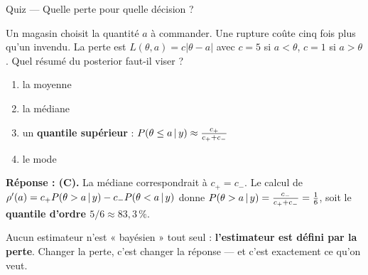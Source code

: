 \begin{frame}{Quiz --- Quelle perte pour quelle décision ?}
\begin{qbox}
Un magasin choisit la quantité $a$ à commander. Une rupture coûte cinq fois plus
qu'un invendu. La perte est
$L(\theta,a)=c|\theta-a|$ avec $c = 5$ si $a<\theta$, $c=1$ si $a>\theta$.
Quel résumé du posterior faut-il viser ?
\vspace{1.5mm}
\begin{enumerate}
  \item[(A)] la moyenne
  \item[(B)] la médiane
  \item[(C)] un \textbf{quantile supérieur} : $P(\theta \leq a \,\vert\, y) \approx \frac{c_+}{c_+ + c_-}$
  \item[(D)] le mode
\end{enumerate}
\vspace{1mm}
\textbf{Réponse : (C).} La médiane correspondrait à $c_+ = c_-$. Le calcul de
$\rho'(a) = c_+ P(\theta > a \,\vert\, y) - c_- P(\theta < a \,\vert\, y)$ donne
$P(\theta > a \,\vert\, y) = \frac{c_-}{c_+ + c_-} = \frac{1}{6}$, soit le
\textbf{quantile d'ordre $5/6 \approx 83{,}3\,\%$}.
\end{qbox}
\vspace{1mm}
\begin{kbox}[Le message]
\small Aucun estimateur n'est « bayésien » tout seul : \textbf{l'estimateur est
défini par la perte}. Changer la perte, c'est changer la réponse --- et c'est
exactement ce qu'on veut.
\end{kbox}
\end{frame}

